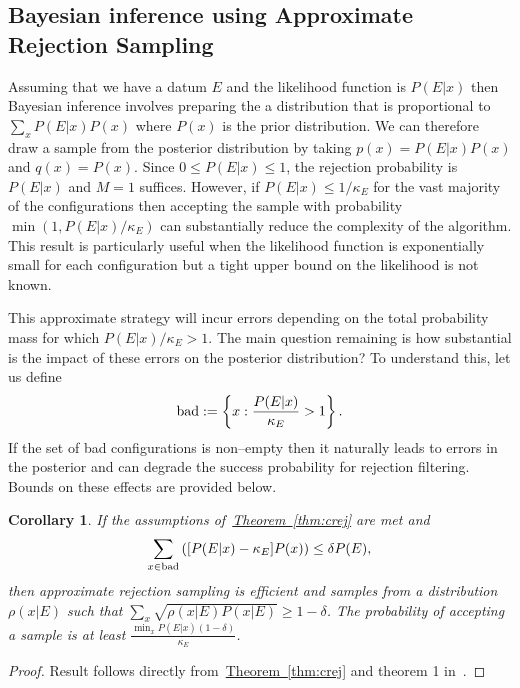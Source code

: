 \documentclass[twoside]{article}
\newtheorem{corollary}{Corollary}
\newcommand{\thm}[1]{\hyperref[thm:#1]{Theorem~\ref*{thm:#1}}}
\begin{document}
\subsection{Bayesian inference using Approximate Rejection Sampling}


Assuming that we have a datum $E$ and the likelihood function is $P(E|x)$ then Bayesian inference
involves preparing the a distribution that is proportional to $\sum_x P(E|x) P(x)$ where $P(x)$ is the
prior distribution.  We can therefore draw a sample from the posterior distribution by taking
$p(x)=P(E|x)P(x)$ and $q(x)=P(x)$.  Since $0\le P(E|x)\le 1$, the rejection probability is $P(E|x)$ and
$M=1$ suffices.  However, if $P(E|x)\le 1/\kappa_E$ for the vast majority of the configurations then
accepting the sample with probability $\min(1,P(E|x)/\kappa_E)$  can substantially reduce the 
complexity of the algorithm.  This result is particularly useful when the likelihood function is exponentially
small for each configuration but a tight upper bound on the likelihood is not known.

This approximate strategy will incur errors depending on the total probability mass
for which $P(E|x)/\kappa_E >1$.   The main question remaining is how substantial is the
impact of these errors on the posterior distribution?  To understand this, let us define
\begin{equation}
{\rm bad} := \left\{x: \frac{P(E|x)}{\kappa_E} >1\right\}.
\end{equation}
If the set of bad configurations is non--empty then it naturally leads to errors in the posterior and
can degrade the success probability for rejection filtering.  Bounds on these effects are
provided below.

\begin{corollary}\label{cor:badalgorithm}
If the assumptions of~\thm{crej} are met and
$$\sum_{x\in {\rm bad}}  \left([P(E|x)-\kappa_E] P(x)\right) \le \delta P(E),$$
  then approximate rejection sampling is  efficient and samples from a distribution $\rho(x|E)$ such that ${\sum_x \sqrt{\rho(x|E) P(x|E)}} \ge 1-\delta$.
The probability of accepting a sample is at least $\frac{\min_x P(E|x) (1-\delta)}{\kappa_E}$.\label{thm:kappa}
\end{corollary}
\begin{proof}
Result follows directly from~\thm{crej} and theorem 1 in~\cite{WKGS15}.
\end{proof}
\end{document}
